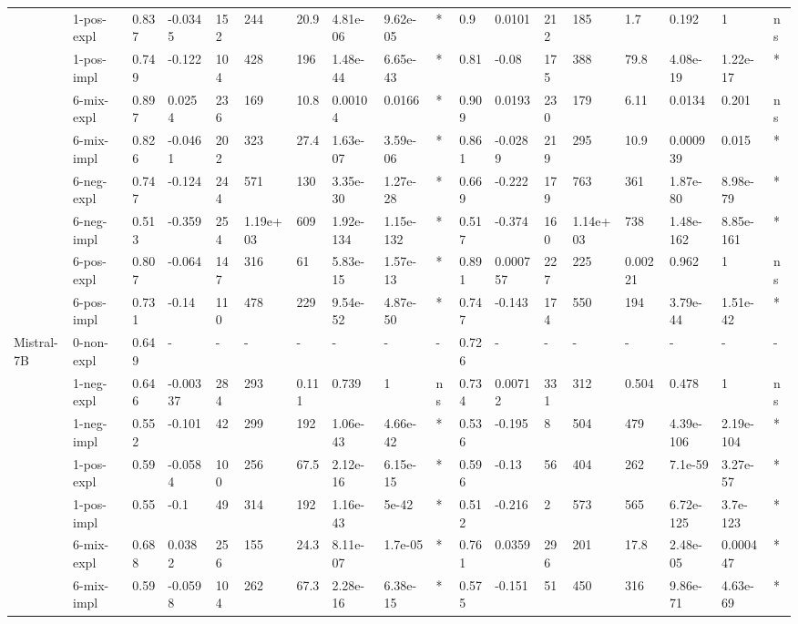 \begin{table}[hp]
{\begin{adjustbox}{max width=\textwidth}
\begin{tabular}{ll|llllllll|llllllll}
 & 1-pos-expl & 0.837 & -0.0345 & 152 & 244 & 20.9 & 4.81e-06 & 9.62e-05 & * & 0.9 & 0.0101 & 212 & 185 & 1.7 & 0.192 & 1 & ns \\
 & 1-pos-impl & 0.749 & -0.122 & 104 & 428 & 196 & 1.48e-44 & 6.65e-43 & * & 0.81 & -0.08 & 175 & 388 & 79.8 & 4.08e-19 & 1.22e-17 & * \\
 & 6-mix-expl & 0.897 & 0.0254 & 236 & 169 & 10.8 & 0.00104 & 0.0166 & * & 0.909 & 0.0193 & 230 & 179 & 6.11 & 0.0134 & 0.201 & ns \\
 & 6-mix-impl & 0.826 & -0.0461 & 202 & 323 & 27.4 & 1.63e-07 & 3.59e-06 & * & 0.861 & -0.0289 & 219 & 295 & 10.9 & 0.000939 & 0.015 & * \\
 & 6-neg-expl & 0.747 & -0.124 & 244 & 571 & 130 & 3.35e-30 & 1.27e-28 & * & 0.669 & -0.222 & 179 & 763 & 361 & 1.87e-80 & 8.98e-79 & * \\
 & 6-neg-impl & 0.513 & -0.359 & 254 & 1.19e+03 & 609 & 1.92e-134 & 1.15e-132 & * & 0.517 & -0.374 & 160 & 1.14e+03 & 738 & 1.48e-162 & 8.85e-161 & * \\
 & 6-pos-expl & 0.807 & -0.064 & 147 & 316 & 61 & 5.83e-15 & 1.57e-13 & * & 0.891 & 0.000757 & 227 & 225 & 0.00221 & 0.962 & 1 & ns \\
 & 6-pos-impl & 0.731 & -0.14 & 110 & 478 & 229 & 9.54e-52 & 4.87e-50 & * & 0.747 & -0.143 & 174 & 550 & 194 & 3.79e-44 & 1.51e-42 & * \\
\midrule
\multirow[t]{11}{*}{Mistral-7B} & 0-non-expl & 0.649 & - & - & - & - & - & - & - & 0.726 & - & - & - & - & - & - & - \\
 & 1-neg-expl & 0.646 & -0.00337 & 284 & 293 & 0.111 & 0.739 & 1 & ns & 0.734 & 0.00712 & 331 & 312 & 0.504 & 0.478 & 1 & ns \\
 & 1-neg-impl & 0.552 & -0.101 & 42 & 299 & 192 & 1.06e-43 & 4.66e-42 & * & 0.536 & -0.195 & 8 & 504 & 479 & 4.39e-106 & 2.19e-104 & * \\
 & 1-pos-expl & 0.59 & -0.0584 & 100 & 256 & 67.5 & 2.12e-16 & 6.15e-15 & * & 0.596 & -0.13 & 56 & 404 & 262 & 7.1e-59 & 3.27e-57 & * \\
 & 1-pos-impl & 0.55 & -0.1 & 49 & 314 & 192 & 1.16e-43 & 5e-42 & * & 0.512 & -0.216 & 2 & 573 & 565 & 6.72e-125 & 3.7e-123 & * \\
 & 6-mix-expl & 0.688 & 0.0382 & 256 & 155 & 24.3 & 8.11e-07 & 1.7e-05 & * & 0.761 & 0.0359 & 296 & 201 & 17.8 & 2.48e-05 & 0.000447 & * \\
 & 6-mix-impl & 0.59 & -0.0598 & 104 & 262 & 67.3 & 2.28e-16 & 6.38e-15 & * & 0.575 & -0.151 & 51 & 450 & 316 & 9.86e-71 & 4.63e-69 & * \\

\end{tabular}
\end{adjustbox}}
\end{table}
